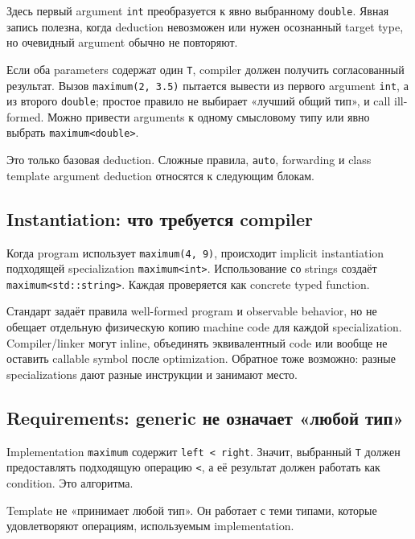 Здесь первый argument \texttt{int} преобразуется к явно выбранному
\texttt{double}. Явная запись полезна, когда deduction невозможен или нужен
осознанный target type, но очевидный argument обычно не повторяют.

Если оба parameters содержат один \texttt{T}, compiler должен получить
согласованный результат. Вызов \texttt{maximum(2, 3.5)} пытается вывести из
первого argument \texttt{int}, а из второго \texttt{double}; простое правило
не выбирает «лучший общий тип», и call ill-formed. Можно привести arguments к
одному смысловому типу или явно выбрать \texttt{maximum<double>}.

Это только базовая deduction. Сложные правила, \texttt{auto}, forwarding и
class template argument deduction относятся к следующим блокам.

\subsection{Instantiation: что требуется compiler}

Когда program использует \texttt{maximum(4, 9)}, происходит implicit
instantiation подходящей specialization \texttt{maximum<int>}. Использование
со strings создаёт \texttt{maximum<std::string>}. Каждая проверяется как
concrete typed function.

Стандарт задаёт правила well-formed program и observable behavior, но не
обещает отдельную физическую копию machine code для каждой specialization.
Compiler/linker могут inline, объединять эквивалентный code или вообще не
оставить callable symbol после optimization. Обратное тоже возможно: разные
specializations дают разные инструкции и занимают место.

\subsection{Requirements: generic не означает «любой тип»}

Implementation \texttt{maximum} содержит \texttt{left < right}. Значит,
выбранный \texttt{T} должен предоставлять подходящую операцию \texttt{<}, а её
результат должен работать как condition. Это  алгоритма.

\begin{importantbox}
Template не «принимает любой тип». Он работает с теми типами, которые
удовлетворяют операциям, используемым implementation.
\end{importantbox}

